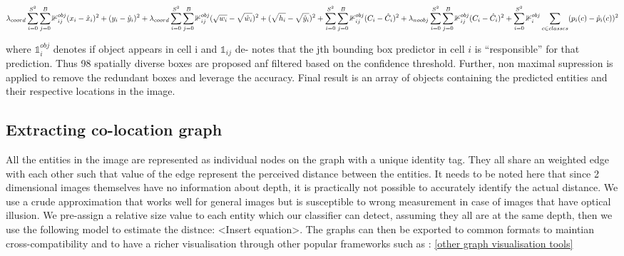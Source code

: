 \documentclass[conference]{IEEEtran}
\begin{document}
        \begin{equation}
        \lambda_{coord} \sum_{i=0}^{S^2} \sum_{j=0}^{B} \mathbb{1}_{ij}^{obj}(x_{i} - \hat x_{i})^{2} + (y_{i} - \hat y_{i})^{2} \\
        
        +  \lambda_{coord} \sum_{i=0}^{S^2} \sum_{j=0}^{B} \mathbb{1}_{ij}^{obj} (\sqrt{ w_{i}} - \sqrt{\hat w_{i}})^{2} + (\sqrt{h_{i}} - \sqrt{\hat y_{i}})^{2} \\
        
        +  \sum_{i=0}^{S^2} \sum_{j=0}^{B} \mathbb{1}_{ij}^{obj}(C_{i} - \hat C_{i})^{2} \\
        
        +  \lambda_{noobj} \sum_{i=0}^{S^2} \sum_{j=0}^{B} \mathbb{1}_{ij}^{obj}(C_{i} - \hat C_{i})^{2} \\
        
        +  \sum_{i=0}^{S^2} \mathbb{1}_{i}^{obj} \sum_{c \in classes} (p_{i}(c) - \hat p_{i}(c))^{2}
        \end{equation}
        
       where $ \mathbb{1}^{obj}_{i} $ denotes if object appears in cell i and $ \mathbb{1}_{ij} $ de-
        notes that the jth bounding box predictor in cell $i$ is “responsible” for that prediction. Thus 98 spatially diverse boxes are proposed anf filtered based on the confidence threshold. Further, non maximal supression is applied to remove the redundant boxes and leverage the accuracy. Final result is an array of objects containing the predicted entities and their respective locations in the image.
        
        
    \subsection{Extracting co-location graph}
        
    All the entities in the image are represented as individual nodes on the graph with a unique identity tag. They all share an weighted edge with each other such that value of the edge represent the perceived distance between the entities. It needs to be noted here that since 2 dimensional images themselves have no information about depth, it is practically not possible to accurately identify the actual distance. We use a crude approximation that works well for general images but is susceptible to wrong measurement in case of images that have optical illusion. We pre-assign a relative size value to each entity which our classifier can detect, assuming they all are at the same depth, then we use the following model to estimate the distnce: <Insert equation>. The graphs can then be exported to common formats to maintian cross-compatibility and to have a richer visualisation through other popular frameworks such as : \ref{other graph visualisation tools}
    
\end{document}
